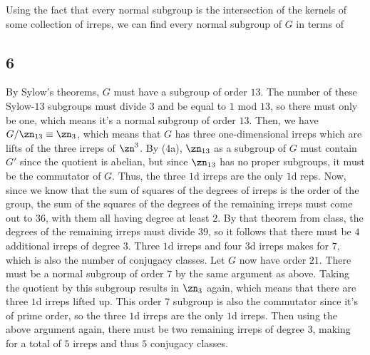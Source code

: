 \documentclass{article}
\begin{document}
Using the fact that every normal subgroup is the intersection of the kernels of some collection of irreps, we can find every normal subgroup of $G$ in terms of 
\subsection*{6}
By Sylow's theorems, $G$ must have a subgroup of order $13$. The number of these Sylow-$13$ subgroups must divide $3$ and be equal to $1$ mod $13$, so there must only be one, which means it's a normal subgroup of order $13$. Then, we have $G/\zn_{13}\equiv\zn_3$, which means that $G$ has three one-dimensional irreps which are lifts of the three irreps of $\zn^3$. By (4a), $\zn_{13}$ as a subgroup of $G$ must contain $G'$ since the quotient is abelian, but since $\zn_{13}$ has no proper subgroups, it must be the commutator of $G$. Thus, the three $1$d irreps are the only $1$d reps. Now, since we know that the sum of squares of the degrees of irreps is the order of the group, the sum of the squares of the degrees of the remaining irreps must come out to $36$, with them all having degree at least $2$. By that theorem from class, the degrees of the remaining irreps must divide $39$, so it follows that there must be $4$ additional irreps of degree $3$.
Three $1$d irreps and four $3$d irreps makes for $7$, which is also the number of conjugacy classes.
Let $G$ now have order $21$. There must be a normal subgroup of order $7$ by the same argument as above. Taking the quotient by this subgroup results in $\zn_3$ again, which means that there are three $1$d irreps lifted up. This order $7$ subgroup is also the commutator since it's of prime order, so the three $1$d irreps are the only $1$d irreps. Then using the above argument again, there must be two remaining irreps of degree $3$, making for a total of $5$ irreps and thus $5$ conjugacy classes.
\end{document}

